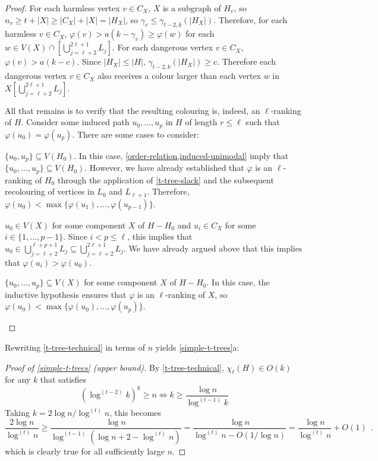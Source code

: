 \documentclass[kpfonts]{patmorin}
\newcommand{\lrn}{\chi_{\ell}}
\theoremstyle{named}
\newcommand{\weirdref}[2]{\cref{#1}#2}
\begin{document}
\begin{proof}
    For each harmless vertex $v\in C_X$, $X$ is a subgraph of $H_v$, so $n_v\ge t+|X|\ge |C_X|+|X|= |H_X|$, so $\gamma_v \le \gamma_{t-2,k}(|H_X|)$. Therefore, for each harmless $v\in C_X$, $\varphi(v)> a(k-\gamma_v)\ge\varphi(w)$ for each $w\in V(X)\cap [\bigcup_{j=\ell+2}^{2\ell+1} L_j]$.  For each dangerous vertex $v\in C_X$, $\varphi(v)>a(k-c)$.  Since $|H_X|\le|H|$, $\gamma_{t-2,k}(|H_X|) \ge c$.  Therefore each dangerous vertex $v\in C_X$ also receives a colour larger than each vertex $w$ in $X[\bigcup_{j=\ell+2}^{2\ell+1} L_j]$.

    All that remains is to verify that the resulting colouring is, indeed, an $\ell$-ranking of $H$.  Consider some induced path $u_0,\ldots,u_p$ in $H$ of length $r\le\ell$ such that $\varphi(u_0)=\varphi(u_p)$.  There are some cases to consider:

    \begin{compactenum}
        \item $\{u_0,u_p\}\subseteq V(H_0)$. In this case, \cref{order-relation,induced-unimodal} imply that $\{u_0,\ldots,u_p\}\subseteq V(H_0)$.  However, we have already established that $\varphi$ is an $\ell$-ranking of $H_0$ through the application of \cref{t-tree-slack} and the subsequent recolouring of vertices in $L_0$ and $L_{\ell+1}$.  Therefore, $\varphi(u_0)<\max\{\varphi(u_1),\ldots,\varphi(u_{p-1})\}$.

        \item $u_0\in V(X)$ for some component $X$ of $H-H_0$ and $u_i\in C_X$ for some $i\in\{1,\ldots,p-1\}$.  Since $i<p\le\ell$, this implies that $u_0\in\bigcup_{j=\ell+2}^{\ell+p+1} L_j\subseteq \bigcup_{j=\ell+2}^{2\ell+1}L_j$.  We have already argued above that this implies that $\varphi(u_i)>\varphi(u_0)$.

        \item $\{u_0,\ldots,u_p\}\subseteq V(X)$ for some component $X$ of $H-H_0$.  In this case, the inductive hypothesis ensures that $\varphi$ is an $\ell$-ranking of $X$, so $\varphi(u_0)<\max\{\varphi(u_0),\ldots,\varphi(u_p)\}$. \qedhere
    \end{compactenum}
\end{proof}

Rewriting \cref{t-tree-technical} in terms of $n$ yields \weirdref{simple-t-trees}{a}:

\begin{proof}[Proof of \cref{simple-t-trees} (upper bound)]
    By \cref{t-tree-technical}, $\lrn(H)\in O(k)$ for any $k$ that satisfies
    \[  (\log^{(t-2)} k)^{k} \ge n \Leftrightarrow
        k \ge \frac{\log n}{\log^{(t-1)} k}
    \]
    Taking $k=2\log n/\log^{(t)} n$, this becomes
    \[
        \frac{2\log n}{\log^{(t)} n}
        \ge \frac{\log n}{\log^{(t-1)}(\log n + 2 -\log^{(t)} n)}
        = \frac{\log n}{\log^{(t)} n - O(1/\log n)}
        = \frac{\log n}{\log^{(t)} n}+O(1) \enspace .
    \]
    which is clearly true for all sufficiently large $n$.
\end{proof}
\end{document}

